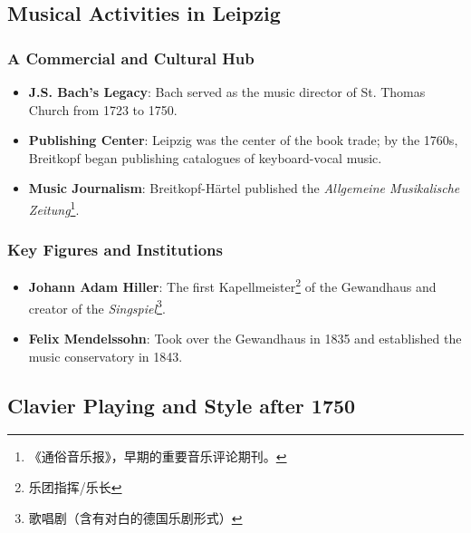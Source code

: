 \documentclass[math,code]{amznotes}
\theoremstyle{remark}
\begin{document}
\subsection{Musical Activities in Leipzig}

\subsubsection{A Commercial and Cultural Hub}
\begin{itemize}
    \item \textbf{J.S. Bach's Legacy}: Bach served as the music director of St. Thomas Church from 1723 to 1750.
    \item \textbf{Publishing Center}: Leipzig was the center of the book trade; by the 1760s, Breitkopf began publishing catalogues of keyboard-vocal music.
    \item \textbf{Music Journalism}: Breitkopf-Härtel published the \textit{Allgemeine Musikalische Zeitung}\footnote{《通俗音乐报》，早期的重要音乐评论期刊。}.
\end{itemize}

\subsubsection{Key Figures and Institutions}
\begin{itemize}
    \item \textbf{Johann Adam Hiller}: The first Kapellmeister\footnote{乐团指挥/乐长} of the Gewandhaus and creator of the \textit{Singspiel}\footnote{歌唱剧（含有对白的德国乐剧形式）}.
    \item \textbf{Felix Mendelssohn}: Took over the Gewandhaus in 1835 and established the music conservatory in 1843.
\end{itemize}

\subsection{Clavier Playing and Style after 1750}
\end{document}
